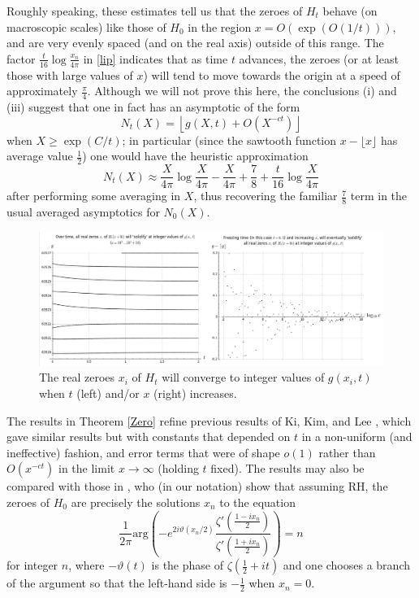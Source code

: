 \documentclass[a4paper,11pt,twoside]{amsart}
\begin{document}
Roughly speaking, these estimates tell us that the zeroes of $H_t$ behave (on macroscopic scales) like those of $H_0$ in the region $x = O(\exp(O(1/t)))$, and are very evenly spaced (and on the real axis) outside of this range.  The factor $\frac{t}{16} \log \frac{x_n}{4\pi}$ in \eqref{lip} indicates that as time $t$ advances, the zeroes (or at least those with large values of $x$) will tend to move towards the origin at a speed of approximately $\frac{\pi}{4}$.  Although we will not prove this here, the conclusions (i) and (iii) suggest that one in fact has an asymptotic of the form
$$ N_t(X) = \left\lfloor g(X,t) + O( X^{-ct} ) \right\rfloor$$
when $X \geq \exp(C/t)$; in particular (since the sawtooth function $x - \lfloor x \rfloor$ has average value $\frac{1}{2}$) one would have the heuristic approximation
$$ N_t(X) \approx \frac{X}{4\pi} \log \frac{X}{4\pi} - \frac{X}{4\pi} + \frac{7}{8} + \frac{t}{16} \log \frac{X}{4\pi} $$
 after performing some averaging in $X$, thus recovering the familiar $\frac{7}{8}$ term in the usual averaged asymptotics for $N_0(X)$.

\begin{figure}[ht!]
  \includegraphics[width=1.0\linewidth]{Integerconvergence_t_and_x_direction.png}
  \caption{The real zeroes $x_i$ of $H_t$ will converge to integer values of $g(x_i,t)$ when $t$ (left) and/or $x$ (right) increases.}
\label{integer_conv_zeros}
\end{figure}

The results in Theorem \ref{Zero} refine previous results of Ki, Kim, and Lee \cite[Theorems 1.3, 1.4]{kkl}, which gave similar results but with constants that depended on $t$ in a non-uniform (and ineffective) fashion, and error terms that were of shape $o(1)$ rather than $O(x^{-ct})$ in the limit $x \to \infty$ (holding $t$ fixed).  The results may also be compared with those in \cite{arias-lune}, who (in our notation) show that assuming RH, the zeroes of $H_0$ are precisely the solutions $x_n$ to the equation
$$ \frac{1}{2\pi} \mathrm{arg}\left( - e^{2 i \vartheta(x_n/2)} \frac{\zeta'(\frac{1-ix_n}{2})}{\zeta'(\frac{1+ix_n}{2})}\right) = n $$
for integer $n$, where $-\vartheta(t)$ is the phase of $\zeta(\frac{1}{2}+it)$ and one chooses a branch of the argument so that the left-hand side is $-\frac{1}{2}$ when $x_n=0$.
\end{document}
